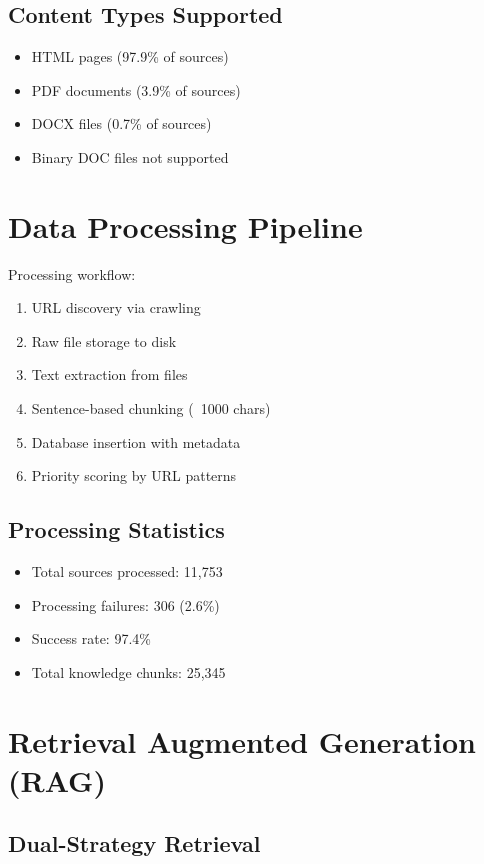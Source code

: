 \documentclass[12pt]{article}
\begin{document}
\subsection{Content Types Supported}

\begin{itemize}
    \item HTML pages (97.9\% of sources)
    \item PDF documents (3.9\% of sources)
    \item DOCX files (0.7\% of sources)
    \item Binary DOC files not supported
\end{itemize}

\section{Data Processing Pipeline}

Processing workflow:
\begin{enumerate}
    \item URL discovery via crawling
    \item Raw file storage to disk
    \item Text extraction from files
    \item Sentence-based chunking (~1000 chars)
    \item Database insertion with metadata
    \item Priority scoring by URL patterns
\end{enumerate}

\subsection{Processing Statistics}

\begin{itemize}
    \item Total sources processed: 11,753
    \item Processing failures: 306 (2.6\%)
    \item Success rate: 97.4\%
    \item Total knowledge chunks: 25,345
\end{itemize}

\section{Retrieval Augmented Generation (RAG)}

\subsection{Dual-Strategy Retrieval}
\end{document}
